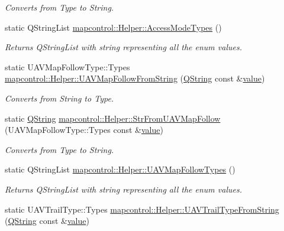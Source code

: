 \begin{DoxyCompactItemize}
\begin{DoxyCompactList}\small\item\em Converts from Type to String. \end{DoxyCompactList}\item 
static Q\-String\-List \hyperlink{group___o_p_map_widget_gacc8738b3a3d1e4f7e0f4578685d495e0}{mapcontrol\-::\-Helper\-::\-Access\-Mode\-Types} ()
\begin{DoxyCompactList}\small\item\em Returns Q\-String\-List with string representing all the enum values. \end{DoxyCompactList}\item 
static U\-A\-V\-Map\-Follow\-Type\-::\-Types \hyperlink{group___o_p_map_widget_ga7708397f9398bd6c207bd305ee711221}{mapcontrol\-::\-Helper\-::\-U\-A\-V\-Map\-Follow\-From\-String} (\hyperlink{group___u_a_v_objects_plugin_gab9d252f49c333c94a72f97ce3105a32d}{Q\-String} const \&\hyperlink{glext_8h_aa0e2e9cea7f208d28acda0480144beb0}{value})
\begin{DoxyCompactList}\small\item\em Converts from String to Type. \end{DoxyCompactList}\item 
static \hyperlink{group___u_a_v_objects_plugin_gab9d252f49c333c94a72f97ce3105a32d}{Q\-String} \hyperlink{group___o_p_map_widget_ga94cca4ceda7e5cdea3ae019436aa0429}{mapcontrol\-::\-Helper\-::\-Str\-From\-U\-A\-V\-Map\-Follow} (U\-A\-V\-Map\-Follow\-Type\-::\-Types const \&\hyperlink{glext_8h_aa0e2e9cea7f208d28acda0480144beb0}{value})
\begin{DoxyCompactList}\small\item\em Converts from Type to String. \end{DoxyCompactList}\item 
static Q\-String\-List \hyperlink{group___o_p_map_widget_gacb5ad4b31c187f1d10098f83053246ff}{mapcontrol\-::\-Helper\-::\-U\-A\-V\-Map\-Follow\-Types} ()
\begin{DoxyCompactList}\small\item\em Returns Q\-String\-List with string representing all the enum values. \end{DoxyCompactList}\item 
static U\-A\-V\-Trail\-Type\-::\-Types \hyperlink{group___o_p_map_widget_ga09a4876b008985c01beda818f860830b}{mapcontrol\-::\-Helper\-::\-U\-A\-V\-Trail\-Type\-From\-String} (\hyperlink{group___u_a_v_objects_plugin_gab9d252f49c333c94a72f97ce3105a32d}{Q\-String} const \&\hyperlink{glext_8h_aa0e2e9cea7f208d28acda0480144beb0}{value})

\end{DoxyCompactItemize}
